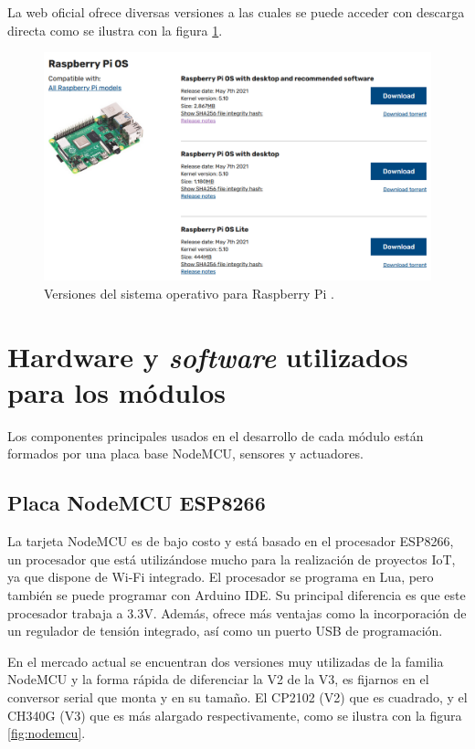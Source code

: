 La web oficial ofrece diversas versiones a las cuales se puede acceder con descarga directa como se ilustra con la figura \ref{fig:so}.

\begin{figure}[htbp]
	\centering
	\includegraphics[width=.95\textwidth]{./Figures/so.png}
	\caption{Versiones del sistema operativo para Raspberry Pi \protect\footnotemark.}
	\label{fig:so}
\end{figure}


\section{Hardware y \emph{software} utilizados para los módulos}

Los componentes principales usados en el desarrollo de cada módulo están formados por una placa base NodeMCU, sensores y actuadores.

\subsection{Placa NodeMCU ESP8266}

La tarjeta NodeMCU es de bajo costo y está basado en el procesador ESP8266, un procesador que está utilizándose mucho para la realización de proyectos IoT, ya que dispone de Wi-Fi integrado. El procesador se programa en Lua, pero también se puede programar con Arduino IDE. Su principal diferencia es que este procesador trabaja a 3.3V.  Además, ofrece más ventajas como la incorporación de un regulador de tensión integrado, así como un puerto USB de programación. 

En el mercado actual se encuentran dos versiones muy utilizadas de la familia NodeMCU y la forma rápida de diferenciar la V2 de la V3, es fijarnos en el conversor serial que monta y en su tamaño. El CP2102 (V2) que es cuadrado, y el CH340G (V3) que es más alargado respectivamente, como se ilustra con la figura \ref{fig:nodemcu}.
 

